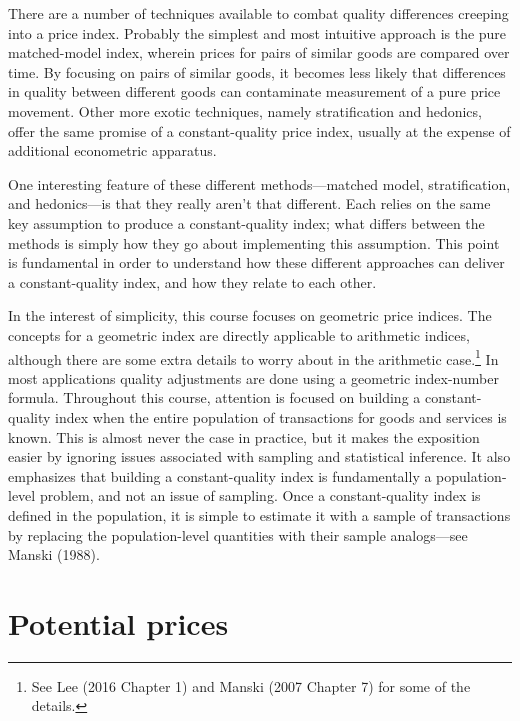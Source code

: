 \documentclass[]{article}
\begin{document}
There are a number of techniques available to combat quality differences creeping into a price index. Probably the simplest and most intuitive approach is the pure matched-model index, wherein prices for pairs of similar goods are compared over time. By focusing on pairs of similar goods, it becomes less likely that differences in quality between different goods can contaminate measurement of a pure price movement. Other more exotic techniques, namely stratification and hedonics, offer the same promise of a constant-quality price index, usually at the expense of additional econometric apparatus.

One interesting feature of these different methods---matched model, stratification, and hedonics---is that they really aren't that different. Each relies on the same key assumption to produce a constant-quality index; what differs between the methods is simply how they go about implementing this assumption. This point is fundamental in order to understand how these different approaches can deliver a constant-quality index, and how they relate to each other.

In the interest of simplicity, this course focuses on geometric price indices. The concepts for a geometric index are directly applicable to arithmetic indices, although there are some extra details to worry about in the arithmetic case.\footnote{See Lee (2016 Chapter 1) and Manski (2007 Chapter 7) for some of the details.} In most applications quality adjustments are done using a geometric index-number formula. Throughout this course, attention is focused on building a constant-quality index when the entire population of transactions for goods and services is known. This is almost never the case in practice, but it makes the exposition easier by ignoring issues associated with sampling and statistical inference. It also emphasizes that building a constant-quality index is fundamentally a population-level problem, and not an issue of sampling. Once a constant-quality index is defined in the population, it is simple to estimate it with a sample of transactions by replacing the population-level quantities with their sample analogs---see Manski (1988).

\hypertarget{potential-prices}{%
\section{Potential prices}\label{potential-prices}}
\end{document}
